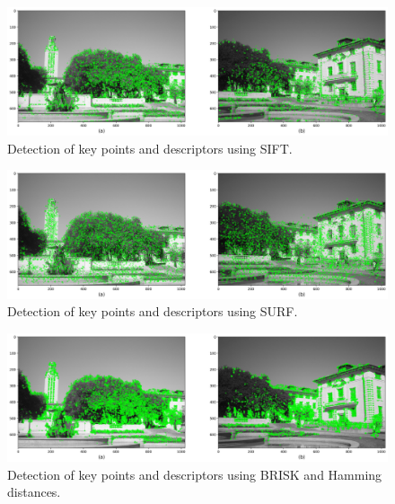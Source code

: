 \documentclass[10pt,twocolumn,letterpaper]{article}
\begin{document}
\begin{figure}[h!]
\begin{center}
	\includegraphics[width=0.99\columnwidth]{pics/sift_features_img_1.jpeg}
	\caption{Detection of key points and descriptors using SIFT. \label{fig:sift-features}}   
\end{center} 
\end{figure}  

\begin{figure}[h!]
\begin{center}
	\includegraphics[width=0.99\columnwidth]{pics/surf_features_img_1.jpeg}
	\caption{Detection of key points and descriptors using SURF. \label{fig:surf-features}}   
\end{center} 
\end{figure}  

\begin{figure}[h!]
\begin{center}
	\includegraphics[width=0.99\columnwidth]{pics/brisk_features_img_1.jpeg}
	\caption{Detection of key points and descriptors using BRISK and Hamming distances. \label{fig:brisk-features}}   
\end{center} 
\end{figure}  
\end{document}

